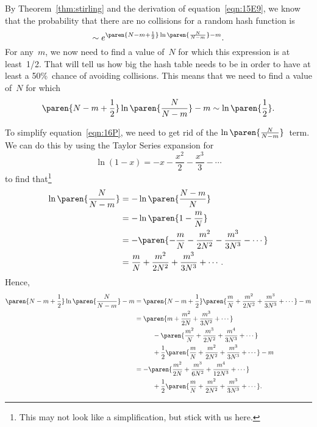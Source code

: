 By Theorem~\ref{thm:stirling} and the derivation of
equation~\eqref{eqn:15E9}, we know that the probability that there are
no collisions for a random hash function is
\begin{equation}\label{eqn:16K}
    \sim e^{ \paren{N - m + \frac{1}{2}} \ln\paren{\frac{N}{N - m}} - m }.
\end{equation}
For any~$m$, we now need to find a value of~$N$ for which this
expression is at least~1/2.  That will tell us how big the hash table
needs to be in order to have at least a 50\%~chance of avoiding
collisions.  This means that we need to find a value of~$N$ for which
\begin{equation}\label{eqn:16P}
    \paren{N - m + \frac{1}{2}} \ln\paren{\frac{N}{N - m}} - m 
        \sim
    \ln\paren{\frac{1}{2}}.
\end{equation}

To simplify equation~\eqref{eqn:16P}, we need to get rid of the
$\ln\paren{\frac{N}{N - m}}$~term.  We can do this by using the Taylor
Series expansion for
\begin{equation*}
    \ln(1 - x) = -x - \frac{x^2}{2} - \frac{x^3}{3} - \cdots
\end{equation*}
to find that\footnote{This may not look like a simplification, but
  stick with us here.}
\begin{align*}
\ln\paren{\frac{N}{N - m}}
    &= - \ln \paren{\frac{N - m}{N}} \\
    &= - \ln \paren{1 - \frac{m}{N}} \\
    &= - \paren{ -\frac{m}{N} - \frac{m^2}{2N^2} - \frac{m^3}{3N^3} - \cdots }\\
    &= \frac{m}{N} + \frac{m^2}{2N^2} + \frac{m^3}{3N^3} + \cdots.
\end{align*}
Hence,
\begin{align}
\paren{N - m + \frac{1}{2}} \ln\paren{\frac{N}{N - m}} - m
    &= \paren{N - m + \frac{1}{2}}
        \paren{\frac{m}{N} + \frac{m^2}{2N^2} + \frac{m^3}{3N^3} + \cdots}
        - m \notag\\
    &= \paren{ m + \frac{m^2}{2N} + \frac{m^3}{3N^2} + \cdots }
            \notag\\
    &\phantom{=}\qquad - \paren{ \frac{m^2}{N} + \frac{m^3}{2N^2} +
          \frac{m^4}{3N^3} + \cdots }
            \notag\\
    &\phantom{=}\qquad + \frac{1}{2} \paren{\frac{m}{N} +
          \frac{m^2}{2N^2} + \frac{m^3}{3N^3} + \cdots} -m 
            \notag\\
    &= - \paren{ \frac{m^2}{2N} + \frac{m^3}{6N^2} + \frac{m^4}{12N^3}
            + \cdots} \notag\\
    &\phantom{=}\qquad
        + \frac{1}{2}\paren{ \frac{m}{N} + \frac{m^2}{2N^2} +
          \frac{m^3}{3N^3} + \cdots }.
    \label{eqn:16Q}
\end{align}


